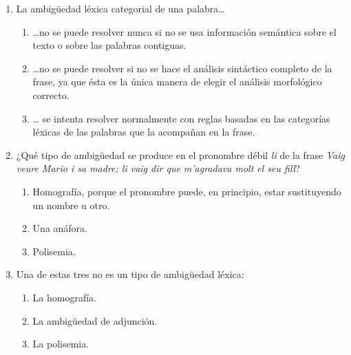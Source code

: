 \begin{enumerate}
\item La ambigüedad léxica categorial de una palabra{\ldots} \begin{enumerate} \item {\ldots}no se puede resolver nunca si no se usa información semántica sobre el texto o sobre las palabras contiguas. \item {\ldots}no se puede resolver si no se hace el análisis sintáctico completo de la frase, ya que ésta es la única manera de elegir el análisis morfológico correcto. \item {\ldots} se intenta resolver normalmente con reglas basadas en las categorías léxicas de las palabras que la acompañan en la frase. \end{enumerate} 

\item ¿Qué tipo de ambigüedad se produce en el pronombre débil \emph{li} de la frase \emph{Vaig veure Mario i sa madre; li vaig dir que m'agradava molt el seu fill}? \begin{enumerate} \item Homografía, porque el pronombre puede, en principio, estar sustituyendo un nombre u otro. \item Una anáfora. \item Polisemia. \end{enumerate} 

\item Una de estas tres no es un tipo de ambigüedad léxica: \begin{enumerate} \item La homografía. \item La ambigüedad de adjunción. \item La polisemia. \end{enumerate} 


\end{enumerate}
